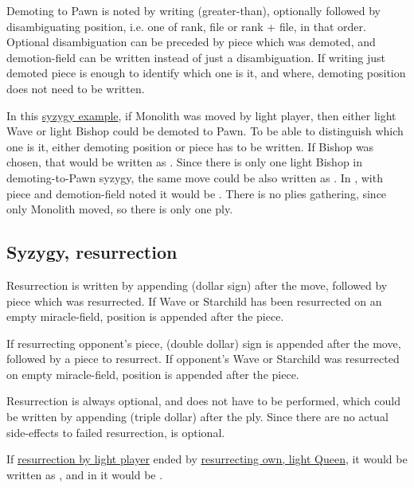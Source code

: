Demoting to Pawn is noted by writing \alg{>} (greater-than), optionally followed by
disambiguating position, i.e. one of rank, file or rank + file, in that order. Optional
disambiguation can be preceded by piece which was demoted, and demotion-field can be
written instead of just a disambiguation. If writing just demoted piece is enough to
identify which one is it, and where, demoting position does not need to be written.

In this \hyperref[fig:scn_d_22_syzygy_2_stars_init]{syzygy example}, if Monolith was
moved by light player, then either light Wave or light Bishop could be demoted to Pawn.
To be able to distinguish which one is it, either demoting position or piece has to be
written. If Bishop was chosen, that would be written as . Since there is
only one light Bishop in demoting-to-Pawn syzygy, the same move could be also written
as . In , with piece and demotion-field noted it would be
. There is no plies gathering, since only Monolith moved, so there
is only one ply.

\subsection*{Syzygy, resurrection}
\label{sec:Appendix/Notation/Syzygy, resurrection}


Resurrection is written by appending \alg{\$} (dollar sign) after the move, followed
by piece which was resurrected. If Wave or Starchild has been resurrected on an empty
miracle-field, position is appended after the piece.

If resurrecting opponent's piece, \alg{\$\$} (double dollar) sign is appended after
the move, followed by a piece to resurrect. If opponent's Wave or Starchild was
resurrected on empty miracle-field, position is appended after the piece.

Resurrection is always optional, and does not have to be performed, which could
be written by appending \alg{\$\$\$} (triple dollar) after the ply. Since there
are no actual side-effects to failed resurrection, \alg{\$\$\$} is optional.

If \hyperref[fig:scn_o_51_syzygy_starchild_init]{resurrection by light player} ended by
\hyperref[fig:scn_o_52_syzygy_starchild_end]{resurrecting own, light Queen}, it would be
written as , and in  it would be .

